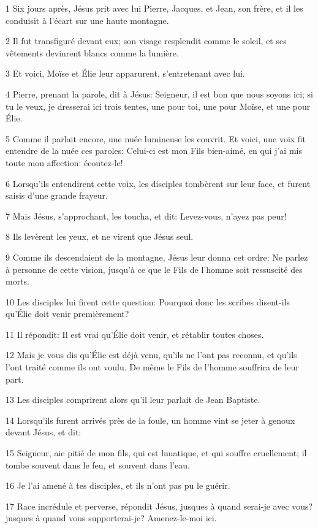 \par 1 Six jours après, Jésus prit avec lui Pierre, Jacques, et Jean, son frère, et il les conduisit à l'écart sur une haute montagne.
\par 2 Il fut transfiguré devant eux; son visage resplendit comme le soleil, et ses vêtements devinrent blancs comme la lumière.
\par 3 Et voici, Moïse et Élie leur apparurent, s'entretenant avec lui.
\par 4 Pierre, prenant la parole, dit à Jésus: Seigneur, il est bon que nous soyons ici; si tu le veux, je dresserai ici trois tentes, une pour toi, une pour Moïse, et une pour Élie.
\par 5 Comme il parlait encore, une nuée lumineuse les couvrit. Et voici, une voix fit entendre de la nuée ces paroles: Celui-ci est mon Fils bien-aimé, en qui j'ai mis toute mon affection: écoutez-le!
\par 6 Lorsqu'ils entendirent cette voix, les disciples tombèrent sur leur face, et furent saisis d'une grande frayeur.
\par 7 Mais Jésus, s'approchant, les toucha, et dit: Levez-vous, n'ayez pas peur!
\par 8 Ils levèrent les yeux, et ne virent que Jésus seul.
\par 9 Comme ils descendaient de la montagne, Jésus leur donna cet ordre: Ne parlez à personne de cette vision, jusqu'à ce que le Fils de l'homme soit ressuscité des morts.
\par 10 Les disciples lui firent cette question: Pourquoi donc les scribes disent-ils qu'Élie doit venir premièrement?
\par 11 Il répondit: Il est vrai qu'Élie doit venir, et rétablir toutes choses.
\par 12 Mais je vous dis qu'Élie est déjà venu, qu'ils ne l'ont pas reconnu, et qu'ils l'ont traité comme ils ont voulu. De même le Fils de l'homme souffrira de leur part.
\par 13 Les disciples comprirent alors qu'il leur parlait de Jean Baptiste.
\par 14 Lorsqu'ils furent arrivés près de la foule, un homme vint se jeter à genoux devant Jésus, et dit:
\par 15 Seigneur, aie pitié de mon fils, qui est lunatique, et qui souffre cruellement; il tombe souvent dans le feu, et souvent dans l'eau.
\par 16 Je l'ai amené à tes disciples, et ils n'ont pas pu le guérir.
\par 17 Race incrédule et perverse, répondit Jésus, jusques à quand serai-je avec vous? jusques à quand vous supporterai-je? Amenez-le-moi ici.
